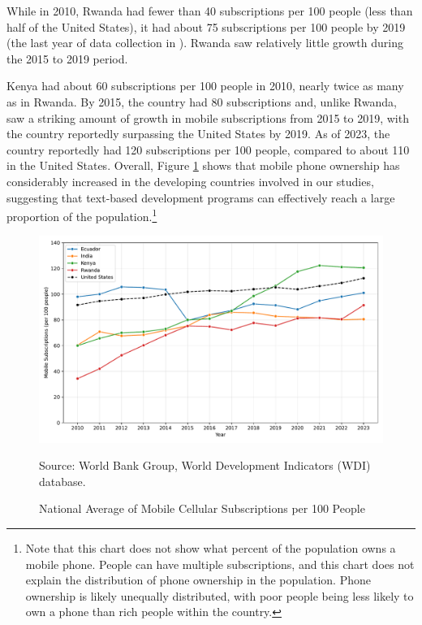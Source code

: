 \documentclass[12pt]{article}
\begin{document}
While in 2010, Rwanda had fewer than 40 subscriptions per 100 people (less than half of the United States), it had about 75 subscriptions per 100 people by 2019 (the last year of data collection in \textcite{fabregas_digital_2025}). Rwanda saw relatively little growth during the 2015 to 2019 period.

Kenya had about 60 subscriptions per 100 people in 2010, nearly twice as many as in Rwanda. By 2015, the country had 80 subscriptions and, unlike Rwanda, saw a striking amount of growth in mobile subscriptions from 2015 to 2019, with the country reportedly surpassing the United States by 2019. As of 2023, the country reportedly had 120 subscriptions per 100 people, compared to about 110 in the United States. Overall, Figure \ref{fig:mobile_subscriptions} shows that mobile phone ownership has considerably increased in the developing countries involved in our studies, suggesting that text-based development programs can effectively reach a large proportion of the population.\footnote{Note that this chart does not show what percent of the population owns a mobile phone. People can have multiple subscriptions, and this chart does not explain the distribution of phone ownership in the population. Phone ownership is likely unequally distributed, with poor people being less likely to own a phone than rich people within the country.}
\begin{figure}[H]
    \centering
    \caption{National Average of Mobile Cellular Subscriptions per 100 People}
    \includegraphics[width=\textwidth]{../output/mobile_subscriptions.pdf}
    \begin{minipage}{0.9\textwidth}
    \footnotesize
    Source: World Bank Group, World Development Indicators (WDI) database. 
    \end{minipage}
    \label{fig:mobile_subscriptions}
\end{figure}
\end{document}
